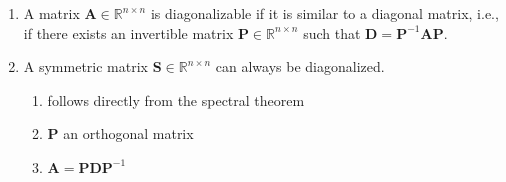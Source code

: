 \begin{enumerate}
    \item 
    \begin{definition}[Diagonalizable]
        A matrix $\bm{A} \in \mathbb{R}^{n\times n}$ is diagonalizable if it is similar to a diagonal matrix, i.e., if there exists an invertible matrix $\bm{P} \in \mathbb{R}^{n\times n}$ such that $\bm{D} = \bm{P}^{-1}\bm{AP}$.
        \hfill \cite{mfml/book/mml/Deisenroth-Faisal-Ong}
    \end{definition}

    \item 
    \begin{theorem}
        A symmetric matrix $\bm{S} \in \mathbb{R}^{n\times n}$ can always be diagonalized.
        \hfill \cite{mfml/book/mml/Deisenroth-Faisal-Ong}
    \end{theorem}
    \begin{enumerate}
        \item follows directly from the spectral theorem
        \hfill \cite{mfml/book/mml/Deisenroth-Faisal-Ong}

        \item $\bm{P}$ an orthogonal matrix
        \hfill \cite{mfml/book/mml/Deisenroth-Faisal-Ong}

        \item $\bm{A} = \bm{PDP}^{-1}$
        \hfill \cite{mfml/book/mml/Deisenroth-Faisal-Ong}
    \end{enumerate}
\end{enumerate}














